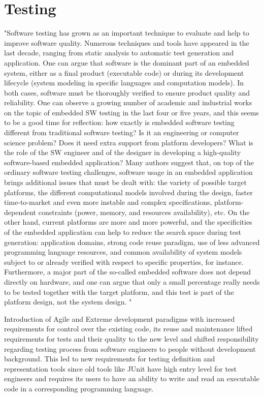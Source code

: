 \chapter{Testing}

"Software testing has grown as an important technique to evaluate and help to improve software quality.
Numerous techniques and tools have appeared in the last decade, ranging from static analysis to automatic test generation and application.
One can argue that software is the dominant part of an embedded system, either as a final product (executable code) or during its development lifecycle (system modeling in specific languages and computation models).
In both cases, software must be thoroughly verified to ensure product quality and reliability.
One can observe a growing number of academic and industrial works on the topic of embedded SW testing in the last four or five years, and this seems to be a good time for reflection: how exactly is embedded software testing different from traditional software testing? 
Is it an engineering or computer science problem? 
Does it need extra support from platform developers? 
What is the role of the SW engineer and of the designer in developing a high-quality software-based embedded application?
Many authors suggest that, on top of the ordinary software testing challenges, software usage in an embedded application brings additional issues that must be dealt with: the variety of possible target platforms, the different computational models involved during the design, faster time-to-market and even more instable and complex specifications, platform-dependent constraints (power, memory, and resources availability), etc.
On the other hand, current platforms are more and more powerful, and the specificities of the embedded application can help to reduce the search space during test generation:
application domains, strong code reuse paradigm, use of less advanced programming language resources, and common availability of system models subject to or already verified with respect to specific properties, for instance.
Furthermore, a major part of the so-called embedded software does not depend directly on hardware, and one can argue that only a small percentage really needs to be tested together with the target platform, and this test is part of the platform design, not the system design. "\cite{cota}

Introduction of Agile and Extreme development paradigms with increased requirements for control over the existing code, its reuse and maintenance lifted requirements for tests and their quality to the new level and shifted responsibility regarding testing process from software engineers to people without development background. 
This led to new requirements for testing definition and representation tools since old tools like JUnit have high entry level for test engineers and requires its users to have an ability to write and read an executable code in a corresponding programming language.


